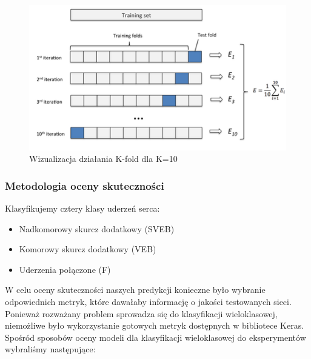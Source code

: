 \documentclass[polish,12pt]{aghthesis}
\begin{document}
\begin{figure}[h!]
	\centering
	\includegraphics[width=0.8\linewidth]{kfold.png}
	\caption{Wizualizacja działania K-fold dla K=10}
	\label{fig:kfold}
\end{figure}

\subsubsection{Metodologia oceny skuteczności}

Klasyfikujemy cztery klasy uderzeń serca:
\begin{itemize}
\item Nadkomorowy skurcz dodatkowy (SVEB)
\item Komorowy skurcz dodatkowy (VEB)
\item Uderzenia połączone (F)

\end{itemize}

W celu oceny skuteczności naszych predykcji konieczne było wybranie odpowiednich metryk, które dawałaby informację o jakości testowanych sieci. Ponieważ rozważany problem sprowadza się do klasyfikacji wieloklasowej, niemożliwe było wykorzystanie gotowych metryk dostępnych w bibliotece Keras. Spośród sposobów oceny modeli dla klasyfikacji wieloklasowej \cite{mlpsurvey2010} do eksperymentów wybraliśmy następujące:
\end{document}
